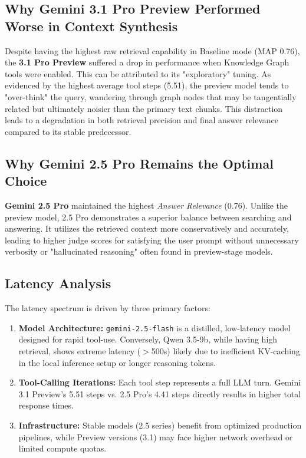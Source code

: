 \documentclass[11pt, a4paper]{article}
\begin{document}
\subsection{Why Gemini 3.1 Pro Preview Performed Worse in Context Synthesis}
Despite having the highest raw retrieval capability in Baseline mode (MAP 0.76), the \textbf{3.1 Pro Preview} suffered a drop in performance when Knowledge Graph tools were enabled. This can be attributed to its "exploratory" tuning. As evidenced by the highest average tool steps (5.51), the preview model tends to "over-think" the query, wandering through graph nodes that may be tangentially related but ultimately noisier than the primary text chunks. This distraction leads to a degradation in both retrieval precision and final answer relevance compared to its stable predecessor.

\subsection{Why Gemini 2.5 Pro Remains the Optimal Choice}
\textbf{Gemini 2.5 Pro} maintained the highest \textit{Answer Relevance} (0.76). Unlike the preview model, 2.5 Pro demonstrates a superior balance between searching and answering. It utilizes the retrieved context more conservatively and accurately, leading to higher judge scores for satisfying the user prompt without unnecessary verbosity or "hallucinated reasoning" often found in preview-stage models.

\subsection{Latency Analysis}
The latency spectrum is driven by three primary factors:
\begin{enumerate}
    \item \textbf{Model Architecture:} \texttt{gemini-2.5-flash} is a distilled, low-latency model designed for rapid tool-use. Conversely, Qwen 3.5-9b, while having high retrieval, shows extreme latency ($>$500s) likely due to inefficient KV-caching in the local inference setup or longer reasoning tokens.
    \item \textbf{Tool-Calling Iterations:} Each tool step represents a full LLM turn. Gemini 3.1 Preview's 5.51 steps vs. 2.5 Pro's 4.41 steps directly results in higher total response times.
    \item \textbf{Infrastructure:} Stable models (2.5 series) benefit from optimized production pipelines, while Preview versions (3.1) may face higher network overhead or limited compute quotas.
\end{enumerate}
\end{document}
